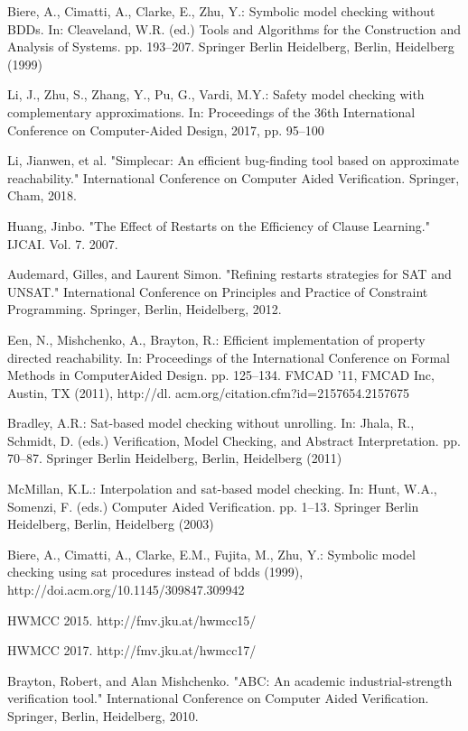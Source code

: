 \begin{thebibliography}{00}
 Biere, A., Cimatti, A., Clarke, E., Zhu, Y.: Symbolic model checking without BDDs. In: Cleaveland, W.R. (ed.) Tools and Algorithms for the Construction and Analysis of Systems. pp. 193–207. Springer Berlin Heidelberg, Berlin, Heidelberg (1999)

 Li, J., Zhu, S., Zhang, Y., Pu, G., Vardi, M.Y.: Safety model checking with complementary approximations. In: Proceedings of the 36th International Conference on Computer-Aided Design, 2017, pp. 95–100

 Li, Jianwen, et al. "Simplecar: An efficient bug-finding tool based on approximate reachability." International Conference on Computer Aided Verification. Springer, Cham, 2018.

 Huang, Jinbo. "The Effect of Restarts on the Efficiency of Clause Learning." IJCAI. Vol. 7. 2007.

 Audemard, Gilles, and Laurent Simon. "Refining restarts strategies for SAT and UNSAT." International Conference on Principles and Practice of Constraint Programming. Springer, Berlin, Heidelberg, 2012.

 Een, N., Mishchenko, A., Brayton, R.: Efficient implementation of property directed reachability. In: Proceedings of the International Conference on Formal Methods in ComputerAided Design. pp. 125–134. FMCAD ’11, FMCAD Inc, Austin, TX (2011), http://dl. acm.org/citation.cfm?id=2157654.2157675

 Bradley, A.R.: Sat-based model checking without unrolling. In: Jhala, R., Schmidt, D. (eds.) Verification, Model Checking, and Abstract Interpretation. pp. 70–87. Springer Berlin Heidelberg, Berlin, Heidelberg (2011)

 McMillan, K.L.: Interpolation and sat-based model checking. In: Hunt, W.A., Somenzi, F. (eds.) Computer Aided Verification. pp. 1–13. Springer Berlin Heidelberg, Berlin, Heidelberg (2003)

 Biere, A., Cimatti, A., Clarke, E.M., Fujita, M., Zhu, Y.: Symbolic model checking using sat procedures instead of bdds (1999), http://doi.acm.org/10.1145/309847.309942

 HWMCC 2015. http://fmv.jku.at/hwmcc15/

 HWMCC 2017. http://fmv.jku.at/hwmcc17/

 Brayton, Robert, and Alan Mishchenko. "ABC: An academic industrial-strength verification tool." International Conference on Computer Aided Verification. Springer, Berlin, Heidelberg, 2010.
\end{thebibliography}
